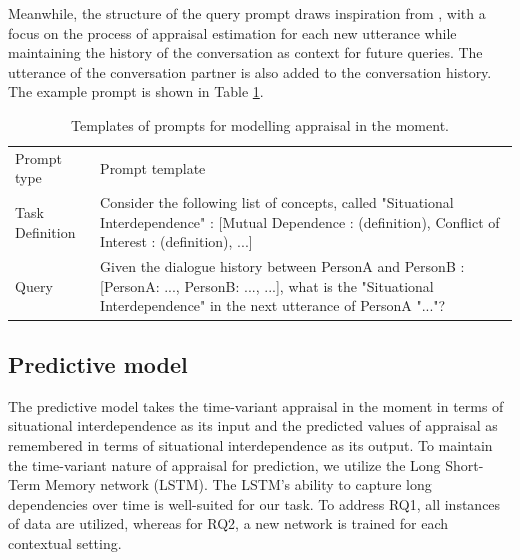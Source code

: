 Meanwhile, the structure of the query prompt draws inspiration from \citeauthor{feng2023affect}\cite{feng2023affect}, with a focus on the process of appraisal estimation for each new utterance while maintaining the history of the conversation as context for future queries. The utterance of the conversation partner is also added to the conversation history. The example prompt is shown in Table \ref{tab:prompts}.

\begin{table}
    \centering
    \begin{tabular}{|p{3cm}|p{7cm}|} \hline
         Prompt type & Prompt template \\ \hhline{|==|}
         Task Definition & Consider the following list of concepts, called "Situational Interdependence" : [Mutual Dependence : (definition), Conflict of Interest : (definition), ...]\\ \hline
         Query & Given the dialogue history between PersonA and PersonB : [PersonA: ..., PersonB: ..., ...], what is the "Situational Interdependence" in the next utterance of PersonA "..."? \\ \hline
    \end{tabular}
    \caption{Templates of prompts for modelling appraisal in the moment. }
    \label{tab:prompts}
\end{table}


\subsection{Predictive model}
The predictive model takes the time-variant appraisal in the moment in terms of situational interdependence as its input and the predicted values of appraisal as remembered in terms of situational interdependence as its output. To maintain the time-variant nature of appraisal for prediction, we utilize the Long Short-Term Memory network (LSTM). The LSTM's ability to capture long dependencies over time is well-suited for our task. To address RQ1, all instances of data are utilized, whereas for RQ2, a new network is trained for each contextual setting.




